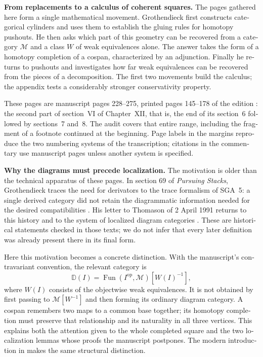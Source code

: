 \begin{otherlanguage}{english}
\begingroup{}
\noindent\textbf{From replacements to a calculus of coherent squares.}
The pages gathered here form a single mathematical movement. Grothendieck first constructs categorical cylinders and uses them to establish the gluing rules for homotopy pushouts. He then asks which part of this geometry can be recovered from a category $\mathcal M$ and a class $W$ of weak equivalences alone. The answer takes the form of a homotopy completion of a cospan, characterized by an adjunction. Finally he returns to pushouts and investigates how far weak equivalences can be recovered from the pieces of a decomposition. The first two movements build the calculus; the appendix tests a considerably stronger conservativity property.

These pages are manuscript pages 228--275, printed pages 145--178 of the edition \citep{Grothendieck1990XIIc}: the second part of section~VI of Chapter~XII, that is, the end of its section~6 followed by sections~7 and~8. The audit covers that entire range, including the fragment of a footnote continued at the beginning. Page labels in the margins reproduce the two numbering systems of the transcription; citations in the commentary use manuscript pages unless another system is specified.

\medskip\noindent\textbf{Why the diagrams must precede localization.}
The motivation is older than the technical apparatus of these pages. In section 69 of \emph{Pursuing Stacks}, Grothendieck traces the need for derivators to the trace formalism of SGA~5: a single derived category did not retain the diagrammatic information needed for the desired compatibilities \citep[\S69, pp.~1--2]{Grothendieck1983}. His letter to Thomason of 2 April 1991 returns to this history and to the system of localized diagram categories \citep[\S2, pp.~5--6]{Grothendieck1991Letter}. These are historical statements checked in those texts; we do not infer that every later definition was already present there in its final form.

Here this motivation becomes a concrete distinction. With the manuscript's contravariant convention, the relevant category is
\[
 \mathbb D(I)=\operatorname{Fun}(I^{\mathrm{op}},\mathcal M)
                  [W(I)^{-1}],
\]
where $W(I)$ consists of the objectwise weak equivalences. It is not obtained by first passing to $\mathcal M[W^{-1}]$ and then forming its ordinary diagram category. A cospan remembers two maps to a common base together; its homotopy completion must preserve that relationship and its naturality in all three vertices. This explains both the attention given to the whole completed square and the two localization lemmas whose proofs the manuscript postpones. The modern introduction in \citet[pp.~313--315]{Groth2013} makes the same structural distinction.


\end{otherlanguage}
